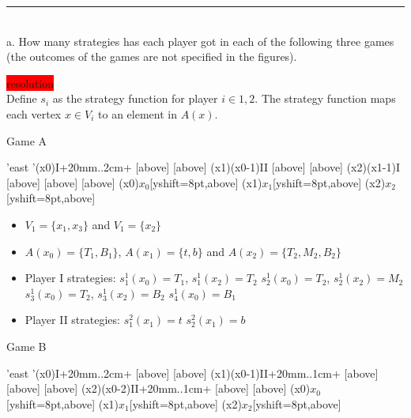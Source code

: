 \documentclass[10pt]{report}
\newenvironment{exercise}[1]
    {\vspace{0.5cm}\hrule\vspace{0.5cm}\noindent\fbox{#1}\\}
    {\vspace{0.5cm}}
\newenvironment{response}
{\vspace{0.2cm}\noindent\colorbox{red}{resolution}}
    {\vspace{0.5cm}}
\begin{document}
\begin{exercise}{3.5}
	a. How many strategies has each player got in each of the following three games (the outcomes of the games are not specified in the figures).


	\begin{response}\\
		Define $s_{i}$ as the strategy function for player $ i \in {1,2} $. The strategy function  maps each vertex $ x \in V_{i} $ to an element in $A(x)$.

		\vspace{0.5cm}
		Game A\\
		\vspace{0.5cm}
		\begin{istgame}[sloped,font=\tiny]
			\setistgrowdirection'{east}
			\setistOvalNodeStyle{.6cm}
			\istrooto'(x0){I}+{20mm}..{2cm}+
			[above]
			[above]
			\endist
			\xtShowEndPoints[oval node, minimum size=6pt]
			\xtdistance{20mm}{10mm}
			\istrooto(x1)(x0-1){II}
			[above]
			[above]
			\endist
			\istrooto(x2)(x1-1){I}
			[above]
			[above]
			[above]
			\endist
			\xtOwner(x0){$x_{0}$}[yshift=8pt,above]
			\xtOwner(x1){$x_{1}$}[yshift=8pt,above]
			\xtOwner(x2){$x_{2}$}[yshift=8pt,above]
		\end{istgame}

		\begin{itemize}
			\item $ V_{1} = \{x_{1}, x_{3}\} $ and $ V_{1} = \{x_{2}\} $
			\item $ A(x_{0}) = \{T_{1}, B_{1}\} $, $  A(x_{1}) = \{t, b\} $ and $A(x_{2}) = \{T_{2},M_{2}, B_{2}\}$
			\item Player I strategies:
			      \subitem $s_{1}^{1}(x_{0}) = T_{1}$, $s_{1}^{1}(x_{2}) = T_{2}$
			      \subitem $s_{2}^{1}(x_{0}) = T_{2}$, $s_{2}^{1}(x_{2}) = M_{2}$
			      \subitem $s_{3}^{1}(x_{0}) = T_{2}$, $s_{3}^{1}(x_{2}) = B_{2}$
			      \subitem $s_{4}^{1}(x_{0}) = B_{1}$
			\item Player II strategies:
			      \subitem $s_{1}^{2}(x_{1}) = t$
			      \subitem $s_{2}^{2}(x_{1}) = b$
		\end{itemize}


		\vspace{0.5cm}
		Game B\\
		\vspace{0.5cm}
		\begin{istgame}[sloped,font=\tiny]
			\setistgrowdirection'{east}
			\setistOvalNodeStyle{.6cm}
			\istrooto'(x0){I}+{20mm}..{2cm}+
			[above]
			[above]
			\endist
			\xtShowEndPoints[oval node, minimum size=6pt]
			\xtdistance{20mm}{10mm}
			\istrooto(x1)(x0-1){II}+{20mm}..{1cm}+
			[above]
			[above]
			[above]
			\endist
			\istrooto(x2)(x0-2){II}+{20mm}..{1cm}+
			[above]
			[above]
			\endist
			\xtOwner(x0){$x_{0}$}[yshift=8pt,above]
			\xtOwner(x1){$x_{1}$}[yshift=8pt,above]
			\xtOwner(x2){$x_{2}$}[yshift=8pt,above]
		\end{istgame}


\end{response}
\end{exercise}
\end{document}
